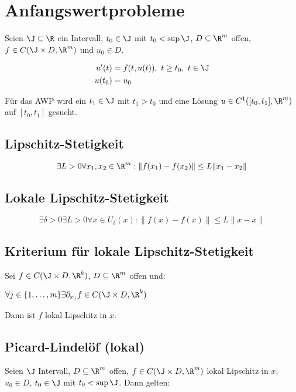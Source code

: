 \section*{Anfangswertprobleme}

Seien \(\J \subseteq \R\) ein Intervall, \(t_0 \in \J\) mit \(t_0 < \sup \J\), \(D \subseteq \R^m\) offen, \(f \in C(\J \times D, \R^m)\) und \(u_0 \in D\).

\vspace*{-4mm}
\begin{align*}
	u'(t)  &= f(t, u(t)), \ t \geq t_0, \ t\in \J \\
	u(t_0) &= u_0
\end{align*}

Für das AWP wird ein \(t_1 \in \J\) mit \(t_1 > t_0\) und eine Lösung \(u \in C^1([t_0, t_1], \R^m)\) auf \([t_0, t_1]\) gesucht.

\subsection*{Lipschitz-Stetigkeit}

\[\exists L > 0 \forall x_1, x_2 \in \R^m : \|f(x_1)-f(x_2)\| \leq L \|x_1-x_2\|\]

\subsection*{Lokale Lipschitz-Stetigkeit}

\[\exists \delta > 0 \exists L > 0 \forall \overline{x} \in U_\delta(x) : \|f(x)-f(\overline{x})\| \leq L \|x-\overline{x}\|\]

\subsection*{Kriterium für lokale Lipschitz-Stetigkeit}

Sei \(f \in C(\J \times D, \R^k)\), \(D \subseteq \R^m\) offen und:

\(\forall j \in \{1,\dots,m\} \exists \partial_{x_j} f \in C(\J \times D, \R^k)\)

Dann ist \(f\) lokal Lipschitz in \(x\).

\subsection*{Picard-Lindelöf (lokal)}

Seien \(\J\) Intervall, \(D \subseteq \R^m\) offen, \(f \in C(\J \times D, \R^m)\) lokal Lipschitz in \(x\), \(u_0 \in D\), \(t_0 \in \J\) mit \(t_0 < \sup \J\). Dann gelten:

